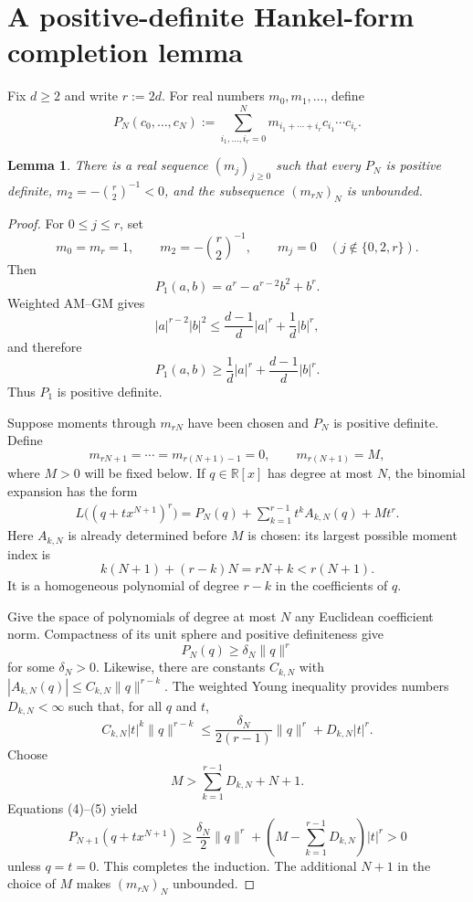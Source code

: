 \documentclass[11pt]{article}
\newtheorem{lemma}[theorem]{Lemma}
\newcommand{\R}{\mathbb R}
\begin{document}
\section{A positive-definite Hankel-form completion lemma}

Fix $d\ge2$ and write $r:=2d$.  For real numbers $m_0,m_1,\ldots$, define
\[
 P_N(c_0,\ldots,c_N)
 :=\sum_{i_1,\ldots,i_r=0}^N
 m_{i_1+\cdots+i_r}c_{i_1}\cdots c_{i_r}.
 \tag{1}
\]

\begin{lemma}\label{lem:completion}
There is a real sequence $(m_j)_{j\ge0}$ such that every $P_N$ is positive
definite, $m_2=-\binom{r}{2}^{-1}<0$, and the subsequence $(m_{rN})_N$ is
unbounded.
\end{lemma}

\begin{proof}
For $0\le j\le r$, set
\[
 m_0=m_r=1,\qquad m_2=-\binom r2^{-1},\qquad
 m_j=0\quad(j\notin\{0,2,r\}).
\]
Then
\[
 P_1(a,b)=a^r-a^{r-2}b^2+b^r.
\]
Weighted AM--GM gives
\[
 |a|^{r-2}|b|^2
 \le \frac{d-1}{d}|a|^r+\frac1d|b|^r,
\]
and therefore
\[
 P_1(a,b)\ge \frac1d|a|^r+\frac{d-1}{d}|b|^r.
 \tag{2}
\]
Thus $P_1$ is positive definite.

Suppose moments through $m_{rN}$ have been chosen and $P_N$ is positive
definite.  Define
\[
 m_{rN+1}=\cdots=m_{r(N+1)-1}=0,
 \qquad m_{r(N+1)}=M,
 \tag{3}
\]
where $M>0$ will be fixed below.  If $q\in\R[x]$ has degree at most $N$, the
binomial expansion has the form
\begin{align}
 L\bigl((q+t x^{N+1})^r\bigr)
 =P_N(q)+\sum_{k=1}^{r-1}t^k A_{k,N}(q)+Mt^r.       \tag{4}
\end{align}
Here $A_{k,N}$ is already determined before $M$ is chosen: its largest
possible moment index is
\[
 k(N+1)+(r-k)N=rN+k<r(N+1).
\]
It is a homogeneous polynomial of degree $r-k$ in the coefficients of $q$.

Give the space of polynomials of degree at most $N$ any Euclidean coefficient
norm.  Compactness of its unit sphere and positive definiteness give
\[
 P_N(q)\ge\delta_N\|q\|^r
\]
for some $\delta_N>0$.  Likewise, there are constants $C_{k,N}$ with
$|A_{k,N}(q)|\le C_{k,N}\|q\|^{r-k}$.  The weighted Young inequality provides
numbers $D_{k,N}<\infty$ such that, for all $q$ and $t$,
\[
 C_{k,N}|t|^k\|q\|^{r-k}
 \le \frac{\delta_N}{2(r-1)}\|q\|^r+D_{k,N}|t|^r.
 \tag{5}
\]
Choose
\[
 M>\sum_{k=1}^{r-1}D_{k,N}+N+1.
\]
Equations (4)--(5) yield
\[
 P_{N+1}(q+t x^{N+1})
 \ge \frac{\delta_N}{2}\|q\|^r
   +\left(M-\sum_{k=1}^{r-1}D_{k,N}\right)|t|^r>0
\]
unless $q=t=0$.  This completes the induction.  The additional $N+1$ in the
choice of $M$ makes $(m_{rN})_N$ unbounded.
\end{proof}
\end{document}
